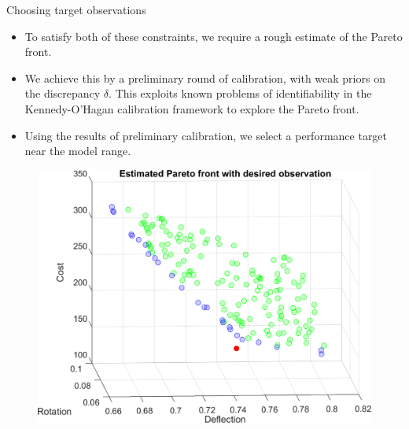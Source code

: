 \documentclass[final]{beamer}
\newlength{\onecolwid}
\begin{document}
\begin{frame}[t]
\begin{columns}[t]
\begin{column}{\onecolwid}
\begin{alertblock}{Choosing target observations}
\begin{itemize}
\item To satisfy both of these constraints, we require a rough estimate of the Pareto front.

\item We achieve this by a preliminary round of calibration, with weak priors on the discrepancy $\delta$. This exploits known problems of identifiability in the Kennedy-O'Hagan calibration framework to explore the Pareto front.

\item Using the results of preliminary calibration, we select a performance target near the model range.

\end{itemize}

\begin{figure}[h!]
\includegraphics[width=0.7\linewidth]{FIG_est_PF_with_des_obs}
\label{blade}
\end{figure}


\end{alertblock}





%
%
%
%


\end{column}
\end{columns}
\end{frame}
\end{document}
